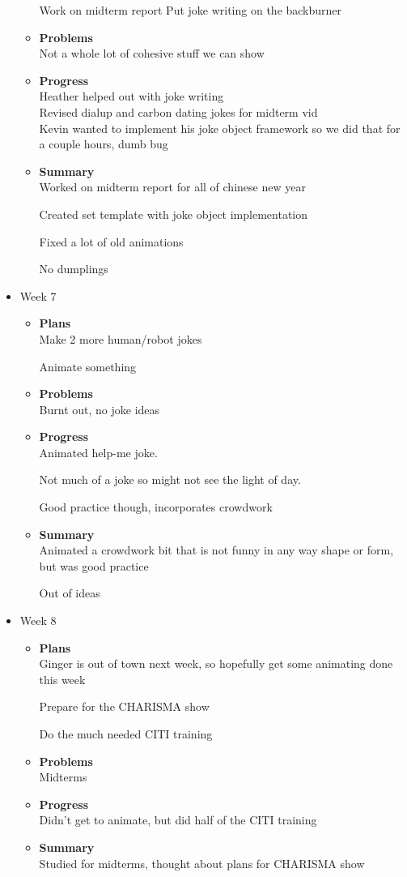 \begin{itemize}
\begin{itemize}
			Work on midterm report
Put joke writing on the backburner
			\item \textbf{Problems} \\
			Not a whole lot of cohesive stuff we can show
			\item \textbf{Progress} \\
			Heather helped out with joke writing \\
Revised dialup and carbon dating jokes for midterm vid \\
Kevin wanted to implement his joke object framework so we did that for a couple hours, dumb bug
			\item \textbf{Summary} \\
			Worked on midterm report for all of chinese new year

Created set template with joke object implementation

Fixed a lot of old animations

No dumplings


		\end{itemize}
		\item{Week 7}
		\begin{itemize}
			\item \textbf{Plans} \\
			Make 2 more human/robot jokes

Animate something
			\item \textbf{Problems} \\
			Burnt out, no joke ideas
			\item \textbf{Progress} \\
			Animated help-me joke.

Not much of a joke so might not see the light of day.

Good practice though, incorporates crowdwork
			\item \textbf{Summary} \\
			Animated a crowdwork bit that is not funny in any way shape or form, but was good practice

Out of ideas
		\end{itemize}
		\item{Week 8}
		\begin{itemize}
			\item \textbf{Plans} \\
			Ginger is out of town next week, so hopefully get some animating done this week

Prepare for the CHARISMA show

Do the much needed CITI training
			\item \textbf{Problems} \\
			Midterms
			\item \textbf{Progress} \\
			Didn't get to animate, but did half of the CITI training
			\item \textbf{Summary} \\
			Studied for midterms, thought about plans for CHARISMA show


\end{itemize}
\end{itemize}
